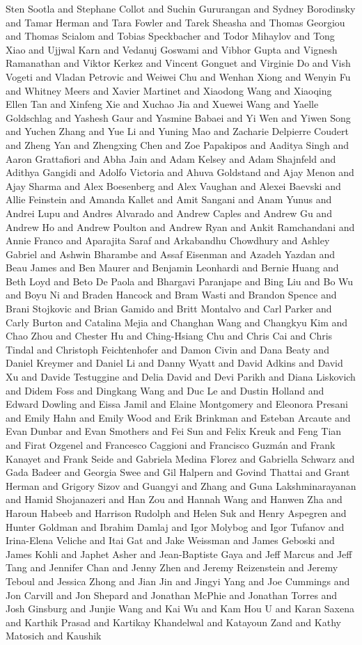 Sten Sootla and Stephane Collot and Suchin Gururangan and Sydney Borodinsky and Tamar Herman and Tara Fowler and Tarek Sheasha and Thomas Georgiou and Thomas Scialom and Tobias Speckbacher and Todor Mihaylov and Tong Xiao and Ujjwal Karn and Vedanuj Goswami and Vibhor Gupta and Vignesh Ramanathan and Viktor Kerkez and Vincent Gonguet and Virginie Do and Vish Vogeti and Vladan Petrovic and Weiwei Chu and Wenhan Xiong and Wenyin Fu and Whitney Meers and Xavier Martinet and Xiaodong Wang and Xiaoqing Ellen Tan and Xinfeng Xie and Xuchao Jia and Xuewei Wang and Yaelle Goldschlag and Yashesh Gaur and Yasmine Babaei and Yi Wen and Yiwen Song and Yuchen Zhang and Yue Li and Yuning Mao and Zacharie Delpierre Coudert and Zheng Yan and Zhengxing Chen and Zoe Papakipos and Aaditya Singh and Aaron Grattafiori and Abha Jain and Adam Kelsey and Adam Shajnfeld and Adithya Gangidi and Adolfo Victoria and Ahuva Goldstand and Ajay Menon and Ajay Sharma and Alex Boesenberg and Alex Vaughan and Alexei Baevski and Allie Feinstein and Amanda Kallet and Amit Sangani and Anam Yunus and Andrei Lupu and Andres Alvarado and Andrew Caples and Andrew Gu and Andrew Ho and Andrew Poulton and Andrew Ryan and Ankit Ramchandani and Annie Franco and Aparajita Saraf and Arkabandhu Chowdhury and Ashley Gabriel and Ashwin Bharambe and Assaf Eisenman and Azadeh Yazdan and Beau James and Ben Maurer and Benjamin Leonhardi and Bernie Huang and Beth Loyd and Beto De Paola and Bhargavi Paranjape and Bing Liu and Bo Wu and Boyu Ni and Braden Hancock and Bram Wasti and Brandon Spence and Brani Stojkovic and Brian Gamido and Britt Montalvo and Carl Parker and Carly Burton and Catalina Mejia and Changhan Wang and Changkyu Kim and Chao Zhou and Chester Hu and Ching-Hsiang Chu and Chris Cai and Chris Tindal and Christoph Feichtenhofer and Damon Civin and Dana Beaty and Daniel Kreymer and Daniel Li and Danny Wyatt and David Adkins and David Xu and Davide Testuggine and Delia David and Devi Parikh and Diana Liskovich and Didem Foss and Dingkang Wang and Duc Le and Dustin Holland and Edward Dowling and Eissa Jamil and Elaine Montgomery and Eleonora Presani and Emily Hahn and Emily Wood and Erik Brinkman and Esteban Arcaute and Evan Dunbar and Evan Smothers and Fei Sun and Felix Kreuk and Feng Tian and Firat Ozgenel and Francesco Caggioni and Francisco Guzmán and Frank Kanayet and Frank Seide and Gabriela Medina Florez and Gabriella Schwarz and Gada Badeer and Georgia Swee and Gil Halpern and Govind Thattai and Grant Herman and Grigory Sizov and Guangyi and Zhang and Guna Lakshminarayanan and Hamid Shojanazeri and Han Zou and Hannah Wang and Hanwen Zha and Haroun Habeeb and Harrison Rudolph and Helen Suk and Henry Aspegren and Hunter Goldman and Ibrahim Damlaj and Igor Molybog and Igor Tufanov and Irina-Elena Veliche and Itai Gat and Jake Weissman and James Geboski and James Kohli and Japhet Asher and Jean-Baptiste Gaya and Jeff Marcus and Jeff Tang and Jennifer Chan and Jenny Zhen and Jeremy Reizenstein and Jeremy Teboul and Jessica Zhong and Jian Jin and Jingyi Yang and Joe Cummings and Jon Carvill and Jon Shepard and Jonathan McPhie and Jonathan Torres and Josh Ginsburg and Junjie Wang and Kai Wu and Kam Hou U and Karan Saxena and Karthik Prasad and Kartikay Khandelwal and Katayoun Zand and Kathy Matosich and Kaushik 